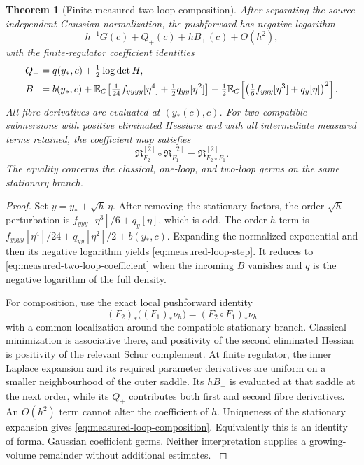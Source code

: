 \documentclass[11pt,oneside,openany]{book}
\newtheorem{theorem}{Theorem}[chapter]
\theoremstyle{definition}
\theoremstyle{remark}
\newcommand{\E}{\mathbb E}
\newcommand{\src}[2]{\cite[#2]{#1}}
\begin{document}
\begin{theorem}[Finite measured two-loop composition]
\label{thm:measured-loop-composition}
After separating the source-independent Gaussian normalization, the
pushforward has negative logarithm
\[
 h^{-1}G(c)+Q_+(c)+hB_+(c)+O(h^2),
\]
with the finite-regulator coefficient identities
\begin{align}
 Q_+&=q(y_*,c)+\tfrac12\log\det H,\notag\\
 B_+&=b(y_*,c)+
 \E_C\!\left[\tfrac1{24}f_{yyyy}[\eta^4]
                      +\tfrac12q_{yy}[\eta^2]\right]
 -\tfrac12\E_C\!\left[\left(\tfrac16f_{yyy}[\eta^3]+q_y[\eta]\right)^2\right].
 \label{eq:measured-loop-step}
\end{align}
All fibre derivatives are evaluated at $(y_*(c),c)$. For two compatible
submersions with positive eliminated Hessians and with all intermediate
measured terms retained, the coefficient map satisfies
\begin{equation}
 \mathfrak R^{[2]}_{F_2}\circ\mathfrak R^{[2]}_{F_1}
                  =\mathfrak R^{[2]}_{F_2\circ F_1}.
 \label{eq:measured-loop-composition}
\end{equation}
The equality concerns the classical, one-loop, and two-loop germs on
the same stationary branch.
\end{theorem}
\begin{proof}
Set $y=y_*+\sqrt h\,\eta$. After removing the stationary factors, the
order-$\sqrt h$ perturbation is
$f_{yyy}[\eta^3]/6+q_y[\eta]$, which is odd. The order-$h$ term is
$f_{yyyy}[\eta^4]/24+q_{yy}[\eta^2]/2+b(y_*,c)$. Expanding the
normalized exponential and then its negative logarithm yields
\cref{eq:measured-loop-step}. It reduces to
\cref{eq:measured-two-loop-coefficient} when the incoming $B$ vanishes
and $q$ is the negative logarithm of the full density.

For composition, use the exact local pushforward identity
\[
 (F_2)_*\bigl((F_1)_*\nu_h\bigr)=(F_2\circ F_1)_*\nu_h
\]
with a common localization around the compatible stationary branch.
Classical minimization is associative there, and positivity of the
second eliminated Hessian is positivity of the relevant Schur
complement. At finite regulator, the inner Laplace expansion and its
required parameter derivatives are uniform on a smaller neighbourhood
of the outer saddle. Its $hB_+$ is evaluated at that saddle at the
next order, while its $Q_+$ contributes both first and second fibre
derivatives. An $O(h^2)$ term cannot alter the coefficient of $h$.
Uniqueness of the stationary expansion gives
\cref{eq:measured-loop-composition}. Equivalently this is an identity
of formal Gaussian coefficient germs. Neither interpretation supplies
a growing-volume remainder without additional estimates.
\src{SM}{V8}
\end{proof}
\end{document}
